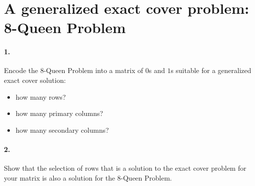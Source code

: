 \documentclass[table]{article}
\begin{document}
\vspace{1em}

\section{A generalized exact cover problem: 8-Queen Problem}

\paragraph{1.} Encode the 8-Queen Problem into a matrix of $0$s and $1$s suitable for a generalized  exact cover solution:  
	\begin{itemize}
		\item how many rows?
		\item how many primary columns?
		\item how many secondary columns?
	\end{itemize}

\paragraph{2.} Show that the selection of rows that is a solution to the exact cover problem for your matrix is also a solution for the 8-Queen Problem.
\end{document}
